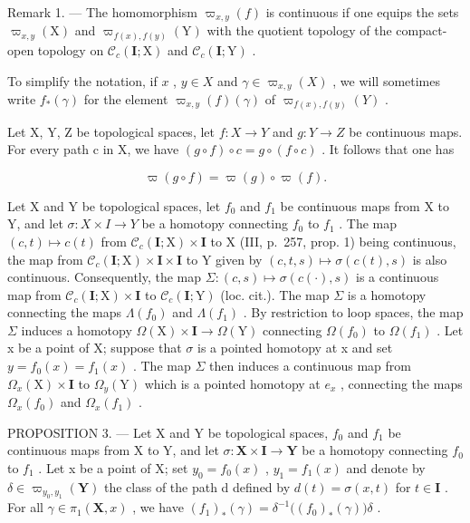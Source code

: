 Remark 1. --- The homomorphism \(\varpi_{x,y}(f)\) is continuous if one equips the sets \(\varpi_{x,y}(\mathrm{X})\) and \(\varpi_{f(x),f(y)}(\mathrm{Y})\) with the quotient topology of the compact-open topology on \(\mathcal{C}_c(\mathbf{I};\mathrm{X})\) and \(\mathcal{C}_c(\mathbf{I};\mathrm{Y})\) .

To simplify the notation, if \(x\) , \(y \in X\) and \(\gamma \in \varpi_{x,y}(X)\) , we will sometimes write \(f_{*}(\gamma)\) for the element \(\varpi_{x,y}(f)(\gamma)\) of \(\varpi_{f(x),f(y)}(Y)\) .

Let X, Y, Z be topological spaces, let \(f: X \to Y\) and \(g: Y \to Z\) be continuous maps. For every path c in X, we have \((g \circ f) \circ c = g \circ (f \circ c)\) . It follows that one has

\[
\varpi (g \circ f) = \varpi (g) \circ \varpi (f).
\]

Let X and Y be topological spaces, let \(f_{0}\) and \(f_{1}\) be continuous maps from X to Y, and let \(\sigma\colon X\times I\to Y\) be a homotopy connecting \(f_{0}\) to \(f_{1}\) . The map \((c,t)\mapsto c(t)\) from \(\mathcal{C}_{c}(\mathbf{I};\mathrm{X})\times\mathbf{I}\) to X (III, p.~257, prop. 1) being continuous, the map from \(\mathcal{C}_{c}(\mathbf{I};\mathrm{X})\times\mathbf{I}\times\mathbf{I}\) to Y given by \((c,t,s)\mapsto\sigma(c(t),s)\) is also continuous. Consequently, the map \(\Sigma\colon(c,s)\mapsto\sigma(c(\cdot),s)\) is a continuous map from \(\mathcal{C}_{c}(\mathbf{I};\mathrm{X})\times\mathbf{I}\) to \(\mathcal{C}_{c}(\mathbf{I};\mathrm{Y})\) (loc. cit.). The map \(\Sigma\) is a homotopy connecting the maps \(\Lambda(f_{0})\) and \(\Lambda(f_{1})\) . By restriction to loop spaces, the map \(\Sigma\) induces a homotopy \(\Omega(\mathrm{X})\times\mathbf{I}\to\Omega(\mathrm{Y})\) connecting \(\Omega(f_{0})\) to \(\Omega(f_{1})\) . Let x be a point of X; suppose that \(\sigma\) is a pointed homotopy at x and set \(y=f_{0}(x)=f_{1}(x)\) . The map \(\Sigma\) then induces a continuous map from \(\Omega_{x}(\mathrm{X})\times\mathbf{I}\) to \(\Omega_{y}(\mathrm{Y})\) which is a pointed homotopy at \(e_{x}\) , connecting the maps \(\Omega_{x}(f_{0})\) and \(\Omega_{x}(f_{1})\) .

PROPOSITION 3. --- Let X and Y be topological spaces, \(f_{0}\) and \(f_{1}\) be continuous maps from X to Y, and let \(\sigma\colon\mathbf{X}\times\mathbf{I}\to\mathbf{Y}\) be a homotopy connecting \(f_{0}\) to \(f_{1}\) . Let x be a point of X; set \(y_{0}=f_{0}(x)\) , \(y_{1}=f_{1}(x)\) and denote by \(\delta\in\varpi_{y_{0},y_{1}}(\mathbf{Y})\) the class of the path d defined by \(d(t)=\sigma(x,t)\) for \(t\in\mathbf{I}\) . For all \(\gamma\in\pi_{1}(\mathbf{X},x)\) , we have \((f_{1})_{*}(\gamma)=\delta^{-1}\big((f_{0})_{*}(\gamma)\big)\delta\) .

